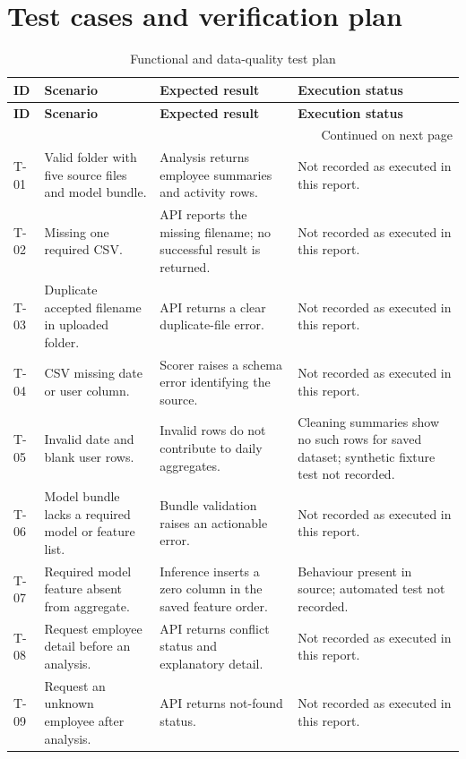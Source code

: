 \documentclass[12pt,a4paper,oneside]{report}
\begin{document}
\section{Test cases and verification plan}
\label{app:test-plan}
\begin{longtable}{|p{}|p{}|p{}|p{}|}
\caption{Functional and data-quality test plan}\label{tab:test-cases}\\
\hline
\textbf{ID} & \textbf{Scenario} & \textbf{Expected result} & \textbf{Execution status}\\\hline
\endfirsthead
\hline
\textbf{ID} & \textbf{Scenario} & \textbf{Expected result} & \textbf{Execution status}\\\hline
\endhead
\hline
\multicolumn{4}{r}{Continued on next page}\\
\endfoot
\hline
\endlastfoot
T-01 & Valid folder with five source files and model bundle. & Analysis returns employee summaries and activity rows. & Not recorded as executed in this report.\\\hline
T-02 & Missing one required CSV. & API reports the missing filename; no successful result is returned. & Not recorded as executed in this report.\\\hline
T-03 & Duplicate accepted filename in uploaded folder. & API returns a clear duplicate-file error. & Not recorded as executed in this report.\\\hline
T-04 & CSV missing date or user column. & Scorer raises a schema error identifying the source. & Not recorded as executed in this report.\\\hline
T-05 & Invalid date and blank user rows. & Invalid rows do not contribute to daily aggregates. & Cleaning summaries show no such rows for saved dataset; synthetic fixture test not recorded.\\\hline
T-06 & Model bundle lacks a required model or feature list. & Bundle validation raises an actionable error. & Not recorded as executed in this report.\\\hline
T-07 & Required model feature absent from aggregate. & Inference inserts a zero column in the saved feature order. & Behaviour present in source; automated test not recorded.\\\hline
T-08 & Request employee detail before an analysis. & API returns conflict status and explanatory detail. & Not recorded as executed in this report.\\\hline
T-09 & Request an unknown employee after analysis. & API returns not-found status. & Not recorded as executed in this report.\\\hline

\end{longtable}
\end{document}
